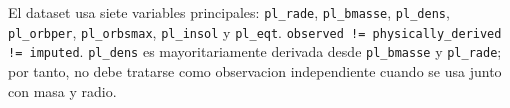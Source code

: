 El dataset usa siete variables principales: \texttt{pl\_rade}, \texttt{pl\_bmasse}, \texttt{pl\_dens}, \texttt{pl\_orbper}, \texttt{pl\_orbsmax}, \texttt{pl\_insol} y \texttt{pl\_eqt}. \texttt{observed != physically\_derived != imputed}. \texttt{pl\_dens} es mayoritariamente derivada desde \texttt{pl\_bmasse} y \texttt{pl\_rade}; por tanto, no debe tratarse como observacion independiente cuando se usa junto con masa y radio.
